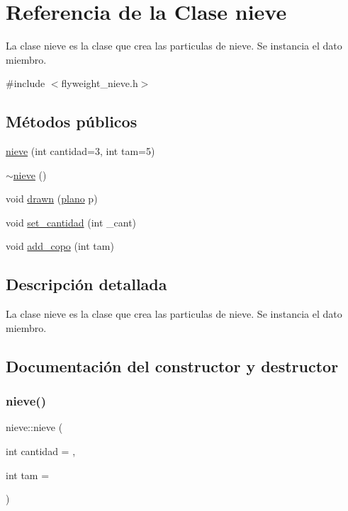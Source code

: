 \hypertarget{classnieve}{}\section{Referencia de la Clase nieve}
\label{classnieve}


La clase nieve es la clase que crea las particulas de nieve.  Se instancia el dato miembro.  




{\ttfamily \#include $<$flyweight\+\_\+nieve.\+h$>$}

\subsection*{Métodos públicos}
\begin{DoxyCompactItemize}
\item 
\hyperlink{classnieve_acb9180479e9ef3330c9794a4fb69831a}{nieve} (int cantidad=3, int tam=5)
\item 
\hyperlink{classnieve_a554baea3727dc5650c5e8cec2f765e24}{$\sim$nieve} ()
\item 
void \hyperlink{classnieve_a0b49a0d373b8d3129fa11137ff6ce3e4}{drawn} (\hyperlink{classplano}{plano} p)
\item 
void \hyperlink{classnieve_a447ff743623611b1dd3bfe617e40d52e}{set\+\_\+cantidad} (int \+\_\+cant)
\item 
void \hyperlink{classnieve_a61ec704dc78cefdb6da47a8d24c59646}{add\+\_\+copo} (int tam)
\end{DoxyCompactItemize}


\subsection{Descripción detallada}
La clase nieve es la clase que crea las particulas de nieve.  Se instancia el dato miembro. 

\subsection{Documentación del constructor y destructor}
\mbox{\label{classnieve_acb9180479e9ef3330c9794a4fb69831a}} 
\subsubsection{\texorpdfstring{nieve()}{nieve()}}
{\footnotesize\ttfamily nieve\+::nieve (\begin{DoxyParamCaption}\item[{int}]{cantidad = {},  }\item[{int}]{tam = {} }\end{DoxyParamCaption})}

